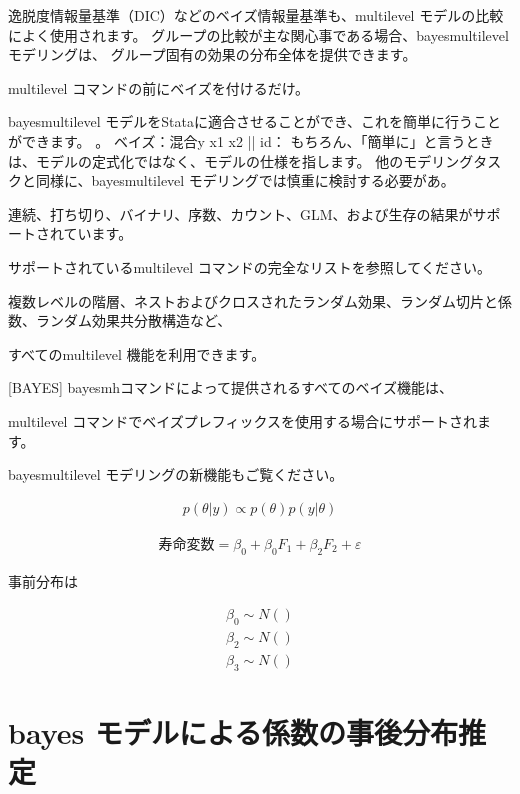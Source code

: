\documentclass[a4j,11pt,mc]{jreport}
\begin{document}
	逸脱度情報量基準（DIC）などのベイズ情報量基準も、multilevel モデルの比較によく使用されます。
	グループの比較が主な関心事である場合、bayesmultilevel モデリングは、
	グループ固有の効果の分布全体を提供できます。

	multilevel コマンドの前にベイズを付けるだけ。


	bayesmultilevel モデルをStataに適合させることができ、これを簡単に行うことができます。
	。
	ベイズ：混合y x1 x2 || id：
	もちろん、「簡単に」と言うときは、モデルの定式化ではなく、モデルの仕様を指します。
	他のモデリングタスクと同様に、bayesmultilevel モデリングでは慎重に検討する必要があ。


	連続、打ち切り、バイナリ、序数、カウント、GLM、および生存の結果がサポートされています。

	サポートされているmultilevel コマンドの完全なリストを参照してください。

	複数レベルの階層、ネストおよびクロスされたランダム効果、ランダム切片と係数、ランダム効果共分散構造など、

	すべてのmultilevel 機能を利用できます。


	 [BAYES] bayesmhコマンドによって提供されるすべてのベイズ機能は、

	 multilevel コマンドでベイズプレフィックスを使用する場合にサポートされます。

	bayesmultilevel モデリングの新機能もご覧ください。


\begin{eqnarray}
   p(\theta|y) \propto p(\theta)p(y|\theta)
\end{eqnarray}



\begin{eqnarray}
\mbox{寿命変数}=\beta_0 +\beta_0F_1 + \beta_2 F_2+\varepsilon
\end{eqnarray}

事前分布は

\begin{eqnarray}
\beta_0 \sim N()\\
\beta_2 \sim N()\\
\beta_3 \sim N()
\end{eqnarray}





\section{bayes モデルによる係数の事後分布推定}
\end{document}
